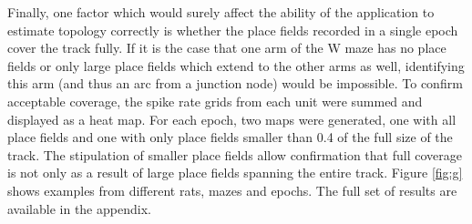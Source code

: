 \documentclass[11pt]{report}
\begin{document}
Finally, one factor which would surely affect the ability of the application to estimate topology correctly is whether the place fields recorded in a single epoch cover the track fully. If it is the case that one arm of the W maze has no place fields or only large place fields which extend to the other arms as well, identifying this arm (and thus an arc from a junction node) would be impossible. 
To confirm acceptable coverage, the spike rate grids from each unit were summed and displayed as a heat map. For each epoch, two maps were generated, one with all place fields and one with only place fields smaller than 0.4 of the full size of the track. The stipulation of smaller place fields allow confirmation that full coverage is not only as a result of large place fields spanning the entire track. Figure \ref{fig:g} shows examples from different rats, mazes and epochs. The full set of results are available in the appendix. \\
 
\end{document}
